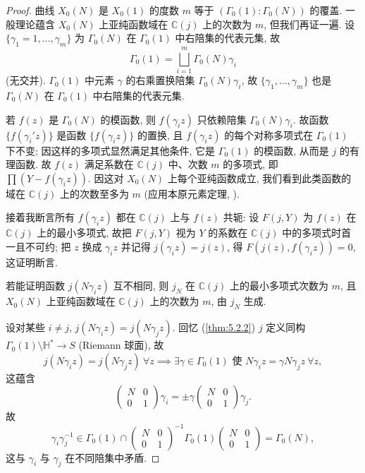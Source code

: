 \begin{proof}
曲线 $X_0(N)$ 是 $X_0(1)$ 的度数 $m$ 等于 $(\Gamma_0(1):\Gamma_0(N))$ 的覆盖. 一般理论蕴含 $X_0(N)$ 上亚纯函数域在 $\mathbb{C}(j)$ 上的次数为 $m$, 但我们再证一遍. 设 $\{\gamma_1 = 1, \dots, \gamma_m\}$ 为 $\Gamma_0(N)$ 在 $\Gamma_0(1)$ 中右陪集的代表元集, 故
\[
\Gamma_0(1) = \bigsqcup_{i=1}^{m}\Gamma_0(N)\gamma_i
\]
(无交并). $\Gamma_0(1)$ 中元素 $\gamma$ 的右乘置换陪集 $\Gamma_0(N)\gamma_i$, 故 $\{\gamma_1, \dots, \gamma_m\}$ 也是 $\Gamma_0(N)$ 在 $\Gamma_0(1)$ 中右陪集的代表元集.

若 $f(z)$ 是 $\Gamma_0(N)$ 的模函数, 则 $f(\gamma_i z)$ 只依赖陪集 $\Gamma_0(N)\gamma_i$. 故函数 $\{f(\gamma_i' z)\}$ 是函数 $\{f(\gamma_i z)\}$ 的置换, 且 $f(\gamma_i z)$ 的每个对称多项式在 $\Gamma_0(1)$ 下不变; 因这样的多项式显然满足其他条件, 它是 $\Gamma_0(1)$ 的模函数, 从而是 $j$ 的有理函数. 故 $f(z)$ 满足系数在 $\mathbb{C}(j)$ 中、次数 $m$ 的多项式, 即 $\prod(Y - f(\gamma_i z))$. 因这对 $X_0(N)$ 上每个亚纯函数成立, 我们看到此类函数的域在 $\mathbb{C}(j)$ 上的次数至多为 $m$ (应用本原元素定理, \cite[5.1]{milne-ft}).

接着我断言所有 $f(\gamma_i z)$ 都在 $\mathbb{C}(j)$ 上与 $f(z)$ 共轭: 设 $F(j, Y)$ 为 $f(z)$ 在 $\mathbb{C}(j)$ 上的最小多项式, 故把 $F(j, Y)$ 视为 $Y$ 的系数在 $\mathbb{C}(j)$ 中的多项式时首一且不可约; 把 $z$ 换成 $\gamma_i z$ 并记得 $j(\gamma_i z) = j(z)$, 得 $F(j(z), f(\gamma_i z)) = 0$, 这证明断言.

若能证明函数 $j(N\gamma_i z)$ 互不相同, 则 $j_N$ 在 $\mathbb{C}(j)$ 上的最小多项式次数为 $m$, 且 $X_0(N)$ 上亚纯函数域在 $\mathbb{C}(j)$ 上的次数为 $m$, 由 $j_N$ 生成.

设对某些 $i\neq j$, $j(N\gamma_i z) = j(N\gamma_j z)$. 回忆 (\ref{thm:5.2.2}) $j$ 定义同构 $\Gamma_0(1)\setminus\mathbb{H}^*\to S$ (Riemann 球面), 故
\[
j(N\gamma_i z) = j(N\gamma_j z) \ \forall z \implies \exists\gamma\in\Gamma_0(1) \text{ 使 } N\gamma_i z = \gamma N\gamma_j z \ \forall z,
\]
这蕴含
\[
\begin{pmatrix}N & 0\\ 0 & 1\end{pmatrix}\gamma_i = \pm\gamma\begin{pmatrix}N & 0\\ 0 & 1\end{pmatrix}\gamma_j.
\]
故
\[
\gamma_i\gamma_j^{-1}\in\Gamma_0(1)\cap\begin{pmatrix}N & 0\\ 0 & 1\end{pmatrix}^{-1}\Gamma_0(1)\begin{pmatrix}N & 0\\ 0 & 1\end{pmatrix} = \Gamma_0(N),
\]
这与 $\gamma_i$ 与 $\gamma_j$ 在不同陪集中矛盾.
\end{proof}

